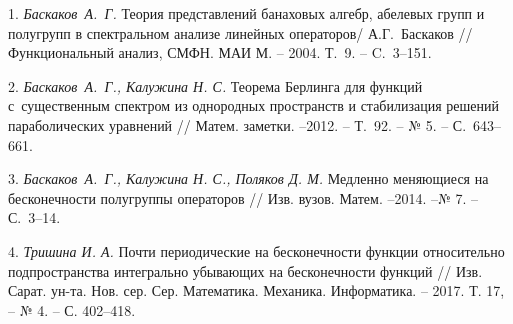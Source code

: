 \litlist

1. {\it Баскаков~А.~Г.} Теория представлений банаховых алгебр, абелевых групп и полугрупп в спектральном анализе линейных операторов/ А.Г.~Баскаков // Функциональный анализ, СМФН. МАИ М. -- 2004. Т.~9. -- C.~3--151.


2. {\it Баскаков~А.~Г., Калужина Н. С.} Теорема Берлинга для функций с~существенным спектром из однородных пространств и стабилизация решений параболических уравнений // Матем. заметки. --2012. -- Т.~92. -- № 5. -- С.~643--661.


3. {\it Баскаков~А.~Г., Калужина Н. С., Поляков Д. М.} Медленно меняющиеся на бесконечности полугруппы операторов // Изв. вузов. Матем. --2014. --№ 7. -- С.~3--14.

4. {\it Тришина И. А.} Почти периодические на бесконечности функции относительно
подпространства интегрально убывающих на бесконечности функций // Изв.
Сарат. ун-та. Нов. сер. Сер. Математика. Механика. Информатика. -- 2017. Т. 17, -- № 4. -- С. 402--418.
